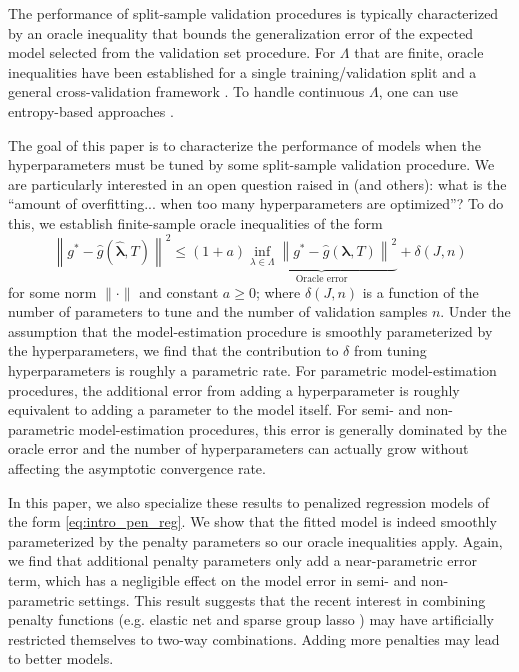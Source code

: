 \documentclass[12pt]{article}
\begin{document}
The performance of split-sample validation procedures is typically characterized by an oracle inequality that bounds the generalization error of the expected model selected from the validation set procedure. For $\Lambda$ that are finite, oracle inequalities have been established for a single training/validation split \citet{gyorfi2006distribution} and a general cross-validation framework \citep{van2003unified, van2004asymptotic}. To handle continuous $\Lambda$, one can use entropy-based approaches \citep{lecue2012oracle}. 

The goal of this paper is to characterize the performance of models when the hyperparameters must be tuned by some split-sample validation procedure. We are particularly interested in an open question raised in \citet{bengio2000gradient} (and others): what is the ``amount of overfitting... when too many hyperparameters are optimized''? To do this, we establish finite-sample oracle inequalities of the form
\begin{equation}
\label{thrm:intro_oracle_ineq}
\left \| g^* - \hat{g}\left (\hat{\boldsymbol{\lambda}}, T \right ) \right \|^2
\le
(1+a)
\underbrace{\inf_{\lambda \in \Lambda} \left \| g^* - \hat{g}\left (\boldsymbol{\lambda} , T \right ) \right \|^2}_{\text{Oracle error}}
+ \delta\left(J,n\right)
\end{equation}
for some norm $\| \cdot \|$ and constant $a \ge 0$; where $\delta(J,n)$ is a function of the number of parameters to tune and the number of validation samples $n$. Under the assumption that the model-estimation procedure is smoothly parameterized by the hyperparameters, we find that the contribution to $\delta$ from tuning hyperparameters is roughly a parametric rate. For parametric model-estimation procedures, the additional error from adding a hyperparameter is roughly equivalent to adding a parameter to the model itself. For semi- and non-parametric model-estimation procedures, this error is generally dominated by the oracle error and the number of hyperparameters can actually grow without affecting the asymptotic convergence rate.

In this paper, we also specialize these results to penalized regression models of the form \eqref{eq:intro_pen_reg}. We show that the fitted model is indeed smoothly parameterized by the penalty parameters so our oracle inequalities apply. Again, we find that additional penalty parameters only add a near-parametric error term, which has a negligible effect on the model error in semi- and non-parametric settings. This result suggests that the recent interest in combining penalty functions (e.g. elastic net and sparse group lasso \citep{zou2003regression, simon2013sparse}) may have artificially restricted themselves to two-way combinations. Adding more penalties may lead to better models.
\end{document}
